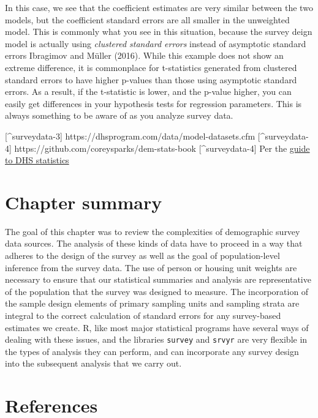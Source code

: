 \documentclass[
  letterpaper,
  DIV=11,
  numbers=noendperiod]{scrreprt}
\begin{document}
In this case, we see that the coefficient estimates are very similar
between the two models, but the coefficient standard errors are all
smaller in the unweighted model. This is commonly what you see in this
situation, because the survey deign model is actually using
\emph{clustered standard errors} instead of asymptotic standard errors
Ibragimov and Müller (2016). While this example does not show an extreme
difference, it is commonplace for t-statistics generated from clustered
standard errors to have higher p-values than those using asymptotic
standard errors. As a result, if the t-statistic is lower, and the
p-value higher, you can easily get differences in your hypothesis tests
for regression parameters. This is always something to be aware of as
you analyze survey data.

{[}\^{}surveydata-3{]} https://dhsprogram.com/data/model-datasets.cfm
{[}\^{}surveydata-4{]} https://github.com/coreysparks/dem-stats-book
{[}\^{}surveydata-4{]} Per the
\href{https://dhsprogram.com/data/Guide-to-DHS-Statistics/index.cfm}{guide
to DHS statistics}

\hypertarget{chapter-summary-1}{%
\section{Chapter summary}\label{chapter-summary-1}}

The goal of this chapter was to review the complexities of demographic
survey data sources. The analysis of these kinds of data have to proceed
in a way that adheres to the design of the survey as well as the goal of
population-level inference from the survey data. The use of person or
housing unit weights are necessary to ensure that our statistical
summaries and analysis are representative of the population that the
survey was designed to measure. The incorporation of the sample design
elements of primary sampling units and sampling strata are integral to
the correct calculation of standard errors for any survey-based
estimates we create. R, like most major statistical programs have
several ways of dealing with these issues, and the libraries
\texttt{survey} and \texttt{srvyr} are very flexible in the types of
analysis they can perform, and can incorporate any survey design into
the subsequent analysis that we carry out.

\hypertarget{references-1}{%
\section{References}\label{references-1}}
\end{document}

